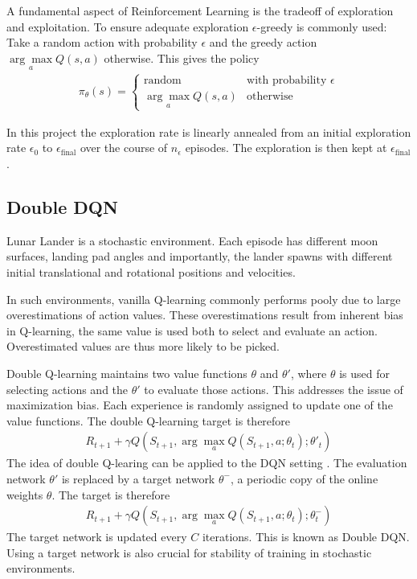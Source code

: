 \documentclass{article}
\begin{document}
A fundamental aspect of Reinforcement Learning is the tradeoff of exploration and exploitation. To ensure adequate exploration $\epsilon$-greedy is commonly used: Take a random action with probability $\epsilon$
and the greedy action $\underset{a}{\arg \max} Q(s,a)$ otherwise. This gives the policy
\begin{align*}
  \pi_\theta (s) =
  \begin{cases}
    \text{random}                   & \text{with probability } \epsilon \\
    \underset{a}{\arg \max} Q(s, a) & \text{otherwise}
  \end{cases}
\end{align*}

In this project the exploration rate is linearly annealed from an initial exploration rate $\epsilon_0$ to $\epsilon_\text{final}$ over the course of $n_\epsilon$ episodes. The exploration is then kept at $\epsilon_\text{final}$.

\subsection{Double DQN}
Lunar Lander is a stochastic environment. Each episode has different moon surfaces, landing pad angles and importantly, the lander spawns with different initial translational and rotational positions and velocities.

In such environments, vanilla Q-learning commonly performs pooly due to large overestimations of action values. These overestimations result from inherent bias in Q-learning, the same value is used both to select and evaluate an action. Overestimated values are thus more likely to be picked.

Double Q-learning maintains two value functions $\theta$ and $\theta'$, where $\theta$ is used for selecting actions and the $\theta'$ to evaluate those actions. This addresses the issue of maximization bias. Each experience is randomly assigned to update one of the value functions. The double Q-learning target is therefore
\begin{align*}
  R_{t+1} + \gamma Q(S_{t+1}, \arg \max_a Q(S_{t+1}, a; \theta_t); \theta'_t)
\end{align*}
The idea of double Q-learing can be applied to the DQN setting \cite{Hasselt2016DeepRL}. The evaluation network $\theta'$ is replaced by a target network $\theta^{-}$, a periodic copy of the online weights $\theta$. The target is therefore
\begin{align*}
  R_{t+1} + \gamma Q(S_{t+1}, \arg \max_a Q(S_{t+1}, a; \theta_t); \theta_t^{-})
\end{align*}
The target network is updated every $C$ iterations. This is known as Double DQN. Using a target network is also crucial for stability of training in stochastic environments.
\end{document}
